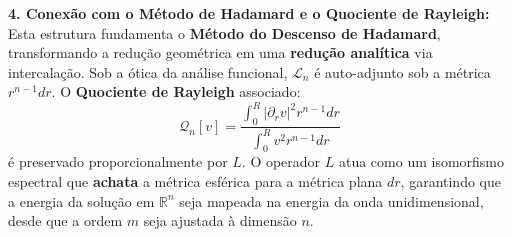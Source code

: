 \documentclass[cs_edp_2026.1.tex]{subfiles} %
\begin{document}
{	\textbf{4. Conexão com o Método de Hadamard e o Quociente de Rayleigh:}
	Esta estrutura fundamenta o \textbf{Método do Descenso de Hadamard}, transformando a redução geométrica em uma \textbf{redução analítica} via intercalação. Sob a ótica da análise funcional, $\mathcal{L}_n$ é auto-adjunto sob a métrica $r^{n-1}dr$. O \textbf{Quociente de Rayleigh} associado:
	$$ \mathcal{Q}_n[v] = \frac{\int_0^R |\partial_r v|^2 r^{n-1} dr}{\int_0^R v^2 r^{n-1} dr} $$
	é preservado proporcionalmente por $L$. O operador $L$ atua como um isomorfismo espectral que \textbf{achata} a métrica esférica para a métrica plana $dr$, garantindo que a energia da solução em $\mathbb{R}^n$ seja mapeada na energia da onda unidimensional, desde que a ordem $m$ seja ajustada à dimensão $n$.
}

\end{document}
